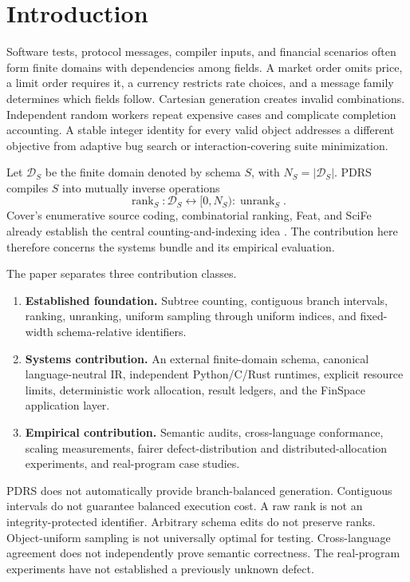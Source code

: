 \documentclass[10pt]{article}
\newcommand{\D}{\mathcal{D}}
\newcommand{\rank}{\operatorname{rank}}
\newcommand{\unrank}{\operatorname{unrank}}
\begin{document}
\section{Introduction}
Software tests, protocol messages, compiler inputs, and financial scenarios often form finite domains with dependencies among fields. A market order omits price, a limit order requires it, a currency restricts rate choices, and a message family determines which fields follow. Cartesian generation creates invalid combinations. Independent random workers repeat expensive cases and complicate completion accounting. A stable integer identity for every valid object addresses a different objective from adaptive bug search or interaction-covering suite minimization.

Let \(\D_S\) be the finite domain denoted by schema \(S\), with \(N_S=|\D_S|\). PDRS compiles \(S\) into mutually inverse operations
\begin{equation}
  \rank_S : \D_S \longleftrightarrow [0,N_S) : \unrank_S.
\end{equation}
Cover's enumerative source coding, combinatorial ranking, Feat, and SciFe already establish the central counting-and-indexing idea \cite{cover1973,nijenhuis1978,feat2012,scife2015}. The contribution here therefore concerns the systems bundle and its empirical evaluation.

The paper separates three contribution classes.
\begin{enumerate}
  \item \textbf{Established foundation.} Subtree counting, contiguous branch intervals, ranking, unranking, uniform sampling through uniform indices, and fixed-width schema-relative identifiers.
  \item \textbf{Systems contribution.} An external finite-domain schema, canonical language-neutral IR, independent Python/C/Rust runtimes, explicit resource limits, deterministic work allocation, result ledgers, and the FinSpace application layer.
  \item \textbf{Empirical contribution.} Semantic audits, cross-language conformance, scaling measurements, fairer defect-distribution and distributed-allocation experiments, and real-program case studies.
\end{enumerate}

PDRS does not automatically provide branch-balanced generation. Contiguous intervals do not guarantee balanced execution cost. A raw rank is not an integrity-protected identifier. Arbitrary schema edits do not preserve ranks. Object-uniform sampling is not universally optimal for testing. Cross-language agreement does not independently prove semantic correctness. The real-program experiments have not established a previously unknown defect.
\end{document}

